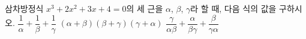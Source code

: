 삼차방정식 $x^3+2x^2+3x+4=0$의 세 근을 $\alpha$, $\beta$, $\gamma$라 할 때, 다음 식의 값을 구하시오.
 $\dfrac{1}{\alpha}+\dfrac{1}{\beta}+\dfrac{1}{\gamma}$
 $(\alpha+\beta)(\beta+\gamma)(\gamma+\alpha)$
 $\dfrac{\gamma}{\alpha\beta}+\dfrac{\alpha}{\beta\gamma}+\dfrac{\beta}{\gamma\alpha}$
